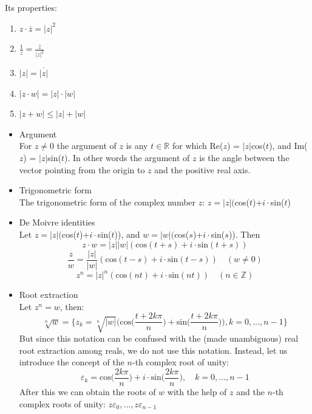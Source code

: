 \documentclass[margin=0px]{article}
\newcommand{\Z}{\mathbb{Z}}
\newcommand{\R}{\mathbb{R}}
\begin{document}
\begin{description}
        Its properties:
        \begin{enumerate}
            \item $z\cdot\overline{z} = {|z|}^2$
            \item $\frac{1}{z}= \frac{\overline{z}}{|z|^2} $
            \item $|z| = \overline{|z|}$
            \item $|z\cdot w | = |z|\cdot|w|$
            \item $|z+w| \leq |z| +|w|$
        \end{enumerate}
    \item[Trigonometric form] \hfill
        \begin{itemize}
            \item Argument \\
                  For $z \neq 0$ the argument of $z$ is any $t \in\R$ for which Re($z$) = $|z|$cos($t$), and Im($z$) = $|z|$sin($t$). In other words the argument of $z$ is the angle between the vector pointing from the origin to $z$ and the positive real axis.
            \item Trigonometric form \\
                  The trigonometric form of the complex number $z$: $ z = |z|($cos($t$)+$i\cdot$sin($t$)
            \item De Moivre identities \\
                  Let $z = |z|($cos($t$)+$i\cdot$sin($t$)), and $w = |w|($cos($s$)+$i\cdot$sin($s$)). Then
                  \[z\cdot w = |z||w|(\textrm{cos}(t+s)+i\cdot \textrm{sin}(t+s))\]
                  \[\frac{z}{w} = \frac{|z|}{|w|}(\textrm{cos}(t-s)+i\cdot \textrm{sin}(t-s)) \quad (w \neq 0)\]
                  \[ z^n = |z|^n(\textrm{cos}(nt)+i\cdot \textrm{sin}(nt)) \quad (n \in \Z)\]
            \item Root extraction \\
                  Let $z^n = w$, then:
                  \[ \sqrt[n]{w} = \Bigg\{z_k = \sqrt[n]{|w|}\bigg(\textrm{cos}\Big(\frac{t+2k\pi}{n}\Big)+\textrm{sin}\Big(\frac{t+2k\pi}{n}\Big)\bigg), k=0,...,n-1\Bigg\} \]
                  But since this notation can be confused with the (made unambiguous) real root extraction among reals, we do not use this notation. Instead, let us introduce the concept of the $n$-th complex root of unity:
                  \[\varepsilon_k = \textrm{cos}\bigg(\frac{2k\pi}{n}\bigg)+i\cdot\textrm{sin}\bigg(\frac{2k\pi}{n}\bigg), \quad k=0,...,n-1\]
                  After this we can obtain the roots of $w$ with the help of $z$ and the $n$-th complex roots of unity: $z\varepsilon_0, ..., z\varepsilon_{n-1}$
        \end{itemize}

\end{description}
\end{document}
